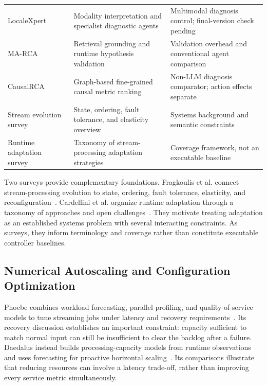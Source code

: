 \begin{table}[t]
\begin{tabularx}{\textwidth}{@{}p{} >{\raggedright\arraybackslash}X >{\raggedright\arraybackslash}X@{}}
LocaleXpert~\cite{zhong2026localexpert} & Modality interpretation and specialist diagnostic agents & Multimodal diagnosis control; final-version check pending \\
MA-RCA~\cite{fu2026marca} & Retrieval grounding and runtime hypothesis validation & Validation overhead and conventional agent comparison \\
CausalRCA~\cite{xin2023causalrca} & Graph-based fine-grained causal metric ranking & Non-LLM diagnosis comparator; action effects separate \\
Stream evolution survey~\cite{fragkoulis2024evolution} & State, ordering, fault tolerance, and elasticity overview & Systems background and semantic constraints \\
Runtime adaptation survey~\cite{cardellini2022adaptation} & Taxonomy of stream-processing adaptation strategies & Coverage framework, not an executable baseline \\
\bottomrule
\end{tabularx}
\end{table}

Two surveys provide complementary foundations. Fragkoulis et al. connect stream-processing evolution to state, ordering, fault tolerance, elasticity, and reconfiguration~\cite{fragkoulis2024evolution}. Cardellini et al. organize runtime adaptation through a taxonomy of approaches and open challenges~\cite{cardellini2022adaptation}. They motivate treating adaptation as an established systems problem with several interacting constraints. As surveys, they inform terminology and coverage rather than constitute executable controller baselines.

\subsection{Numerical Autoscaling and Configuration Optimization}
Phoebe combines workload forecasting, parallel profiling, and quality-of-service models to tune streaming jobs under latency and recovery requirements~\cite{geldenhuys2022phoebe}. Its recovery discussion establishes an important constraint: capacity sufficient to match normal input can still be insufficient to clear the backlog after a failure. Daedalus instead builds processing-capacity models from runtime observations and uses forecasting for proactive horizontal scaling~\cite{pfister2024daedalus}. Its comparisons illustrate that reducing resources can involve a latency trade-off, rather than improving every service metric simultaneously.

